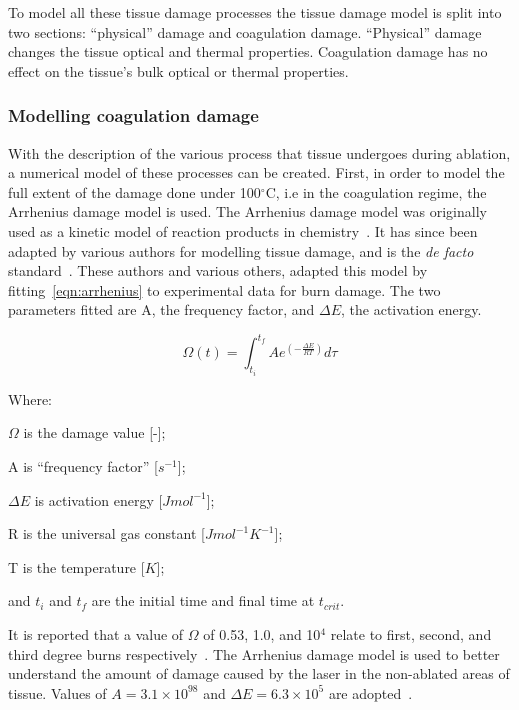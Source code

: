 To model all these tissue damage processes the tissue damage model is split into two sections: ``physical'' damage and coagulation damage. ``Physical'' damage changes the tissue optical and thermal properties. Coagulation damage has no effect on the tissue's bulk optical or thermal properties.

\subsubsection*{Modelling coagulation damage}\label{sec:coagdamage}
With the description of the various process that tissue undergoes during ablation, a numerical model of these processes can be created.
First, in order to model the full extent of the damage done under 100${^{\circ}}$C, i.e in the coagulation regime, the Arrhenius damage model is used. The Arrhenius damage model was originally used as a kinetic model of reaction products in chemistry~\cite{pearce2009relationship}. It has since been adapted by various authors for modelling tissue damage, and is the \textit{de facto} standard~\cite{hendriques1947studies,jiang2002effects}. These authors and various others, adapted this model by fitting~\cref{eqn:arrhenius} to experimental data for burn damage. The two parameters fitted are A, the frequency factor, and $\Delta E$, the activation energy.

\begin{equation}
\Omega(t)=\int^{t_{f}}_{t_i} Ae^{(-\tfrac{\Delta E}{RT})}d\tau
\label{eqn:arrhenius}
\end{equation}


\noindent Where:

	\indent $\Omega$ is the damage value [-];
	
	\indent A is ``frequency factor'' [$s^{-1}$];
	
	\indent $\Delta E$ is activation energy [$J mol^{-1}$];
	
	\indent R is the universal gas constant [$J mol^{-1} K^{-1}$];
	
	\indent T is the temperature [$K$];
	
	\indent and $t_i$ and $t_f$ are the initial time and final time at $t_{crit}$.
	
	\medskip

It is reported that a value of $\Omega$ of 0.53, 1.0, and 10$^4$ relate to first, second, and third degree burns respectively~\cite{diller1983finite}. The Arrhenius damage model is used to better understand the amount of damage caused by the laser in the non-ablated areas of tissue. Values of $A=3.1\times10^{98}$ and $\Delta E=6.3\times10^5$ are adopted~\cite{zhang2007dynamic,sagi1992heating,hendriques1947studies}.

